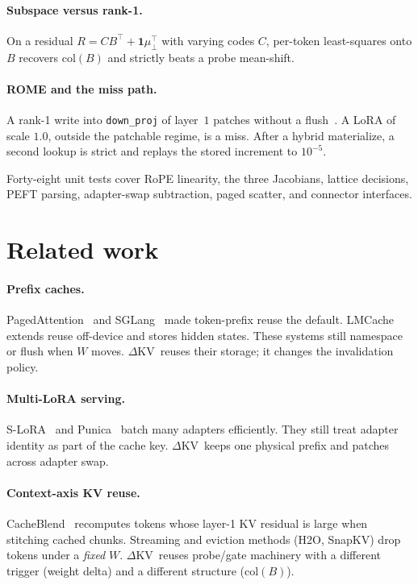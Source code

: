 \documentclass{article}
\newcommand{\dkv}{$\Delta$KV}
\begin{document}
\paragraph{Subspace versus rank-1.}
On a residual $R=CB^\top+\mathbf{1}\mu_\perp^\top$ with varying codes
$C$, per-token least-squares onto $B$ recovers $\mathrm{col}(B)$ and
strictly beats a probe mean-shift.

\paragraph{ROME and the miss path.}
A rank-1 write into \texttt{down\_proj} of layer~$1$ patches without a
flush~\citep{meng2022rome}.
A LoRA of scale $1.0$, outside the patchable regime, is a miss.
After a hybrid materialize, a second lookup is strict and replays the
stored increment to $10^{-5}$.

Forty-eight unit tests cover RoPE linearity, the three Jacobians, lattice
decisions, PEFT parsing, adapter-swap subtraction, paged scatter, and
connector interfaces.

\section{Related work}
\label{sec:related}

\paragraph{Prefix caches.}
PagedAttention~\citep{kwon2023vllm} and SGLang~\citep{zheng2024sglang}
made token-prefix reuse the default.
LMCache~\citep{lmcache} extends reuse off-device and stores hidden
states.
These systems still namespace or flush when $W$ moves.
\dkv\ reuses their storage; it changes the invalidation policy.

\paragraph{Multi-LoRA serving.}
S-LoRA~\citep{sheng2024slora} and Punica~\citep{chen2024punica} batch
many adapters efficiently.
They still treat adapter identity as part of the cache key.
\dkv\ keeps one physical prefix and patches across adapter swap.

\paragraph{Context-axis KV reuse.}
CacheBlend~\citep{yao2024cacheblend} recomputes tokens whose layer-1 KV
residual is large when stitching cached chunks.
Streaming and eviction methods (H2O, SnapKV) drop tokens under a
\emph{fixed} $W$.
\dkv\ reuses probe/gate machinery with a different trigger (weight
delta) and a different structure ($\mathrm{col}(B)$).
\end{document}
